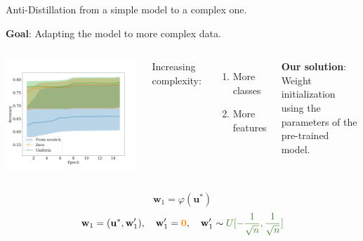 \documentclass[dvipsnames]{beamer}
\begin{document}
\begin{frame}{Anti-Distillation from a simple model to a complex one.}

\textbf{Goal}: Adapting the model to more complex data.

\begin{columns}[c]
\includegraphics[width=\textwidth]{accuracy.png}

Increasing complexity:

\begin{enumerate}
    \item More classes
    \item More features
\end{enumerate}

\bigskip

\textbf{Our solution}: Weight initialization using the parameters of the pre-trained model.

\end{columns}

$$\mathbf{w}_1 = \varphi(\mathbf{u}^*)$$
$$\mathbf{w}_1 = (\mathbf{u}^*, \mathbf{w}_1'),\quad \mathbf{w}_1' = {\color{orange}\mathbf{0}}, \quad  \mathbf{w}_1' \sim {\color{OliveGreen} U[-\frac{1}{\sqrt{n}}, \frac{1}{\sqrt{n}}]}$$

\end{frame}
\end{document}
